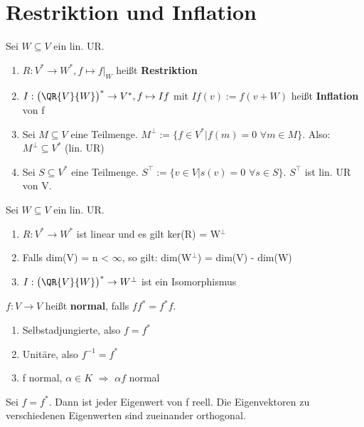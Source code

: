 \section{Restriktion und Inflation}
\begin{definition}
Sei $W \subseteq V$ ein lin. UR.
\begin{enumerate}
\item $R: V^* \to W^*, f \mapsto f|_W$ heißt \textbf{Restriktion}
\item $I: \big(\QR{V}{W}\big)^* \to V^*, f \mapsto If$ mit $If(v) := f(v + W)$ heißt \textbf{Inflation}  von f
\item Sei $M \subseteq V$ eine Teilmenge. $M^\perp := \{ f \in V^* | f(m) = 0$ $\forall m \in M \}$. Also: $M^\perp \subseteq V^*$ (lin. UR)
\item Sei $S \subseteq V^*$ eine Teilmenge. $S^\top := \{ v \in V | s(v) = 0$ $\forall s \in S \}$. $S^\top$ ist lin. UR von V.
\end{enumerate}
\end{definition}

\begin{lemma}
Sei $W \subseteq V$ ein lin. UR.
\begin{enumerate}
\item $R: V^* \to W^*$ ist linear und es gilt ker(R) = W$^\perp$
\item Falls dim(V) = n < $\infty$, so gilt: dim(W$^\perp$) = dim(V) - dim(W)
\item $I: \big(\QR{V}{W}\big)^* \to W^\perp$ ist ein Isomorphismus
\end{enumerate}
\end{lemma}

\begin{definition}
$f: V \to V$ heißt \textbf{normal}, falls $ff^*=f^*f$.
\end{definition}

\begin{example}
\leavevmode
\begin{enumerate}
\item Selbstadjungierte, also $f = f^*$
\item Unitäre, also $f^{-1} = f^*$
\item f normal, $\alpha \in K$ $\Rightarrow$ $\alpha f$ normal
\end{enumerate}
\end{example}
\begin{lemma}
Sei $f = f^*$. Dann ist jeder Eigenwert von f reell. Die Eigenvektoren zu verschiedenen Eigenwerten sind zueinander orthogonal.
\end{lemma}

